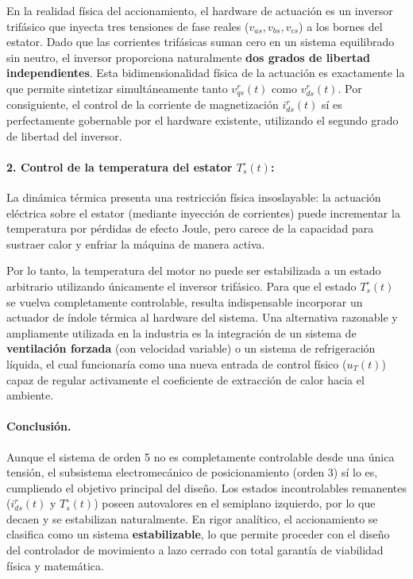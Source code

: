 \documentclass[10pt,a4paper]{article}
\begin{document}
En la realidad física del accionamiento, el hardware de actuación es un inversor trifásico que inyecta tres tensiones de fase reales ($v_{as}, v_{bs}, v_{cs}$) a los bornes del estator. Dado que las corrientes trifásicas suman cero en un sistema equilibrado sin neutro, el inversor proporciona naturalmente \textbf{dos grados de libertad independientes}. Esta bidimensionalidad física de la actuación es exactamente la que permite sintetizar simultáneamente tanto $v_{qs}^r(t)$ como $v_{ds}^r(t)$. Por consiguiente, el control de la corriente de magnetización $i_{ds}^r(t)$ sí es perfectamente gobernable por el hardware existente, utilizando el segundo grado de libertad del inversor.

\paragraph{2. Control de la temperatura del estator $T_s^\circ(t)$:}
La dinámica térmica presenta una restricción física insoslayable: la actuación eléctrica sobre el estator (mediante inyección de corrientes) puede incrementar la temperatura por pérdidas de efecto Joule, pero carece de la capacidad para sustraer calor y enfriar la máquina de manera activa. 

Por lo tanto, la temperatura del motor no puede ser estabilizada a un estado arbitrario utilizando únicamente el inversor trifásico. Para que el estado $T_s^\circ(t)$ se vuelva completamente controlable, resulta indispensable incorporar un actuador de índole térmica al hardware del sistema. Una alternativa razonable y ampliamente utilizada en la industria es la integración de un sistema de \textbf{ventilación forzada} (con velocidad variable) o un sistema de refrigeración líquida, el cual funcionaría como una nueva entrada de control físico ($u_T(t)$) capaz de regular activamente el coeficiente de extracción de calor hacia el ambiente.

\paragraph{Conclusión.}
Aunque el sistema de orden 5 no es completamente controlable desde una única tensión, el subsistema electromecánico de posicionamiento (orden 3) sí lo es, cumpliendo el objetivo principal del diseño. Los estados incontrolables remanentes ($i_{ds}^r(t)$ y $T_s^\circ(t)$) poseen autovalores en el semiplano izquierdo, por lo que decaen y se estabilizan naturalmente. En rigor analítico, el accionamiento se clasifica como un sistema \textbf{estabilizable}, lo que permite proceder con el diseño del controlador de movimiento a lazo cerrado con total garantía de viabilidad física y matemática.
\end{document}

